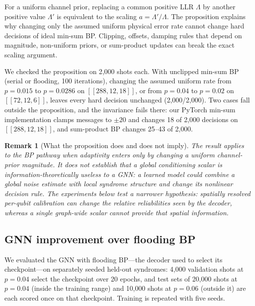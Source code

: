\documentclass[a4paper,twocolumn,11pt,nopdfoutputerror]{quantumarticle}
\newcommand{\code}[3]{\ensuremath{[\![#1,#2,#3]\!]}}
\newtheorem{remark}{Remark}
\begin{document}
For a uniform channel prior, replacing a common positive LLR $\Lambda$
by another positive value $\Lambda'$ is equivalent to the scaling
$a=\Lambda'/\Lambda$. The proposition explains why changing only the assumed uniform physical
error rate cannot change hard decisions of ideal min-sum BP. Clipping, offsets, damping rules that depend on
magnitude, non-uniform priors, or sum-product updates can break the exact
scaling argument.

We checked the proposition on 2{,}000 shots each. With unclipped
min-sum BP (serial or flooding, 100 iterations), changing the assumed
uniform rate from $p=0.015$ to $p=0.0286$ on $\code{288}{12}{18}$, or from
$p=0.04$ to $p=0.02$ on $\code{72}{12}{6}$, leaves every hard decision
unchanged (2{,}000/2{,}000). Two cases fall outside the proposition, and
the invariance fails there: our PyTorch min-sum implementation clamps
messages to $\pm20$ and changes 18 of 2{,}000 decisions on
$\code{288}{12}{18}$, and sum-product BP changes 25--43 of 2{,}000.

\begin{remark}[What the proposition does and does not imply]
The result applies to the BP pathway when adaptivity enters only by
changing a uniform channel-prior magnitude. It does \emph{not} establish
that a global conditioning scalar is information-theoretically useless
to a GNN: a learned model could combine a global noise estimate with
local syndrome structure and change its nonlinear decision rule. The experiments below test a narrower hypothesis: spatially resolved
per-qubit calibration can change the relative reliabilities seen by the
decoder, whereas a single graph-wide scalar cannot provide that spatial
information.
\end{remark}

\subsection{GNN improvement over flooding BP}\label{sec:gnn_positive}

We evaluated the GNN with flooding BP---the decoder used to select its
checkpoint---on separately seeded held-out syndromes: 4{,}000
validation shots at $p=0.04$ select the checkpoint over 20 epochs, and
test sets of 20{,}000 shots at $p=0.04$ (inside the training range) and
10{,}000 shots at $p=0.06$ (outside it) are each scored once on that
checkpoint. Training is repeated with five seeds.
\end{document}
